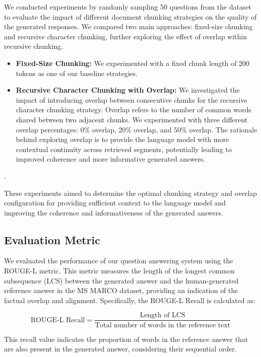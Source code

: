 \documentclass{article}
\begin{document}
We conducted experiments by randomly sampling 50 questions from the dataset to evaluate the impact of different document chunking strategies on the quality of the generated responses. We compared two main approaches: fixed-size chunking and recursive character chunking, further exploring the effect of overlap within recursive chunking.

\begin{itemize}
    \item \textbf{Fixed-Size Chunking:}
    We experimented with a fixed chunk length of 200 tokens as one of our baseline strategies.

    \item \textbf{Recursive Character Chunking with Overlap:}
    We investigated the impact of introducing overlap between consecutive chunks for the recursive character chunking strategy. Overlap refers to the number of common words shared between two adjacent chunks. We experimented with three different overlap percentages: 0\% overlap, 20\% overlap, and 50\% overlap. The rationale behind exploring overlap is to provide the language model with more contextual continuity across retrieved segments, potentially leading to improved coherence and more informative generated answers.
\end{itemize}.

These experiments aimed to determine the optimal chunking strategy and overlap configuration for providing sufficient context to the language model and improving the coherence and informativeness of the generated answers.

\subsection{Evaluation Metric}

We evaluated the performance of our question answering system using the ROUGE-L metric. This metric measures the length of the longest common subsequence (LCS) between the generated answer and the human-generated reference answer in the MS MARCO\cite{MS_MARCO} dataset, providing an indication of the factual overlap and alignment. Specifically, the ROUGE-L Recall is calculated as:

$$
\text{ROUGE-L Recall} = \frac{\text{Length of LCS}}{\text{Total number of words in the reference text}}
$$

This recall value indicates the proportion of words in the reference answer that are also present in the generated answer, considering their sequential order.
\end{document}
